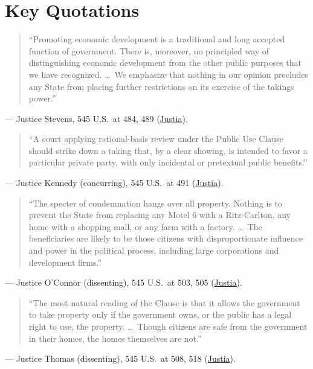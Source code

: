 \documentclass[12pt]{article}
\begin{document}
\section{Key Quotations}
\begin{quote}
``Promoting economic development is a traditional and long accepted function of government. There is, moreover, no principled way of distinguishing economic development from the other public purposes that we have recognized. \dots\ We emphasize that nothing in our opinion precludes any State from placing further restrictions on its exercise of the takings power.''
\end{quote}
\noindent --- Justice Stevens, 545 U.S.\ at 484, 489 (\href{https://supreme.justia.com/cases/federal/us/545/469/}{Justia}).

\begin{quote}
``A court applying rational-basis review under the Public Use Clause should strike down a taking that, by a clear showing, is intended to favor a particular private party, with only incidental or pretextual public benefits.''
\end{quote}
\noindent --- Justice Kennedy (concurring), 545 U.S.\ at 491 (\href{https://supreme.justia.com/cases/federal/us/545/469/}{Justia}).

\begin{quote}
``The specter of condemnation hangs over all property. Nothing is to prevent the State from replacing any Motel 6 with a Ritz-Carlton, any home with a shopping mall, or any farm with a factory. \dots\ The beneficiaries are likely to be those citizens with disproportionate influence and power in the political process, including large corporations and development firms.''
\end{quote}
\noindent --- Justice O'Connor (dissenting), 545 U.S.\ at 503, 505 (\href{https://supreme.justia.com/cases/federal/us/545/469/}{Justia}).

\begin{quote}
``The most natural reading of the Clause is that it allows the government to take property only if the government owns, or the public has a legal right to use, the property. \dots\ Though citizens are safe from the government in their homes, the homes themselves are not.''
\end{quote}
\noindent --- Justice Thomas (dissenting), 545 U.S.\ at 508, 518 (\href{https://supreme.justia.com/cases/federal/us/545/469/}{Justia}).
\end{document}
